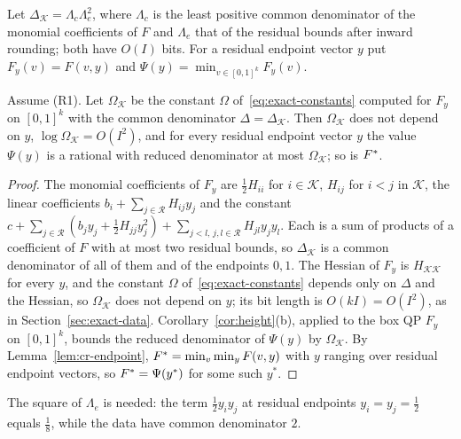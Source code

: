 Let $\Delta_{\mathcal K}=\Lambda_c\Lambda_e^2$, where $\Lambda_c$ is the
least positive common denominator of the monomial coefficients of $F$ and
$\Lambda_e$ that of the residual bounds after inward rounding; both have
$O(I)$ bits. For a residual
endpoint vector $y$ put $F_y(v)=F(v,y)$ and
$\Psi(y)=\min_{v\in[0,1]^k}F_y(v)$.

\begin{lemma}\label{lem:cr-height}
Assume (R1). Let $\Omega_{\mathcal K}$ be the constant $\Omega$
of~\eqref{eq:exact-constants} computed for $F_y$ on $[0,1]^k$ with the
common denominator $\Delta=\Delta_{\mathcal K}$. Then $\Omega_{\mathcal K}$
does not depend on $y$, $\log\Omega_{\mathcal K}=O(I^2)$, and for every
residual endpoint vector $y$ the value $\Psi(y)$ is a rational with reduced
denominator at most $\Omega_{\mathcal K}$; so is $F^{*}$.
\end{lemma}

\begin{proof}
The monomial coefficients of $F_y$ are $\frac12H_{ii}$ for $i\in\mathcal K$,
$H_{ij}$ for $i<j$ in $\mathcal K$, the linear coefficients
$b_i+\sum_{j\in\mathcal R}H_{ij}y_j$ and the constant
$c+\sum_{j\in\mathcal R}(b_jy_j+\frac12H_{jj}y_j^2)
+\sum_{j<l,\,j,l\in\mathcal R}H_{jl}y_jy_l$. Each is a sum of products of a
coefficient of $F$ with at most two residual bounds, so $\Delta_{\mathcal K}$
is a common denominator of all of them and of the endpoints $0,1$. The
Hessian of $F_y$ is $H_{\mathcal K\mathcal K}$ for every $y$, and the
constant $\Omega$ of~\eqref{eq:exact-constants} depends only on $\Delta$ and
the Hessian, so $\Omega_{\mathcal K}$ does not depend on $y$; its bit
length is $O(kI)=O(I^2)$, as in Section~\ref{sec:exact-data}.
Corollary~\ref{cor:height}(b), applied to the box QP $F_y$ on
$[0,1]^k$, bounds the reduced denominator of $\Psi(y)$ by
$\Omega_{\mathcal K}$. By Lemma~\ref{lem:cr-endpoint},
$F^{*}=\min_v\min_{y}F(v,y)$ with $y$ ranging over residual endpoint vectors,
so $F^{*}=\Psi(y^*)$ for some such $y^*$.
\end{proof}

The square of $\Lambda_e$ is needed: the term $\frac12y_iy_j$ at residual
endpoints $y_i=y_j=\frac12$ equals $\frac18$, while the data have common
denominator $2$.

